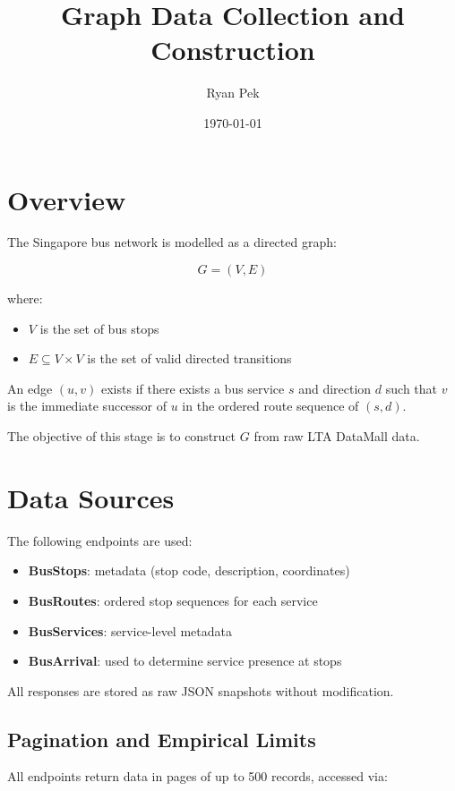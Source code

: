 \documentclass[11pt,a4paper]{article}
\title{Graph Data Collection and Construction}
\author{Ryan Pek}
\date{\today}
\begin{document}
\maketitle

\section{Overview}

The Singapore bus network is modelled as a directed graph:

\[
G = (V, E)
\]

where:

\begin{itemize}
    \item $V$ is the set of bus stops
    \item $E \subseteq V \times V$ is the set of valid directed transitions
\end{itemize}

An edge $(u,v)$ exists if there exists a bus service $s$ and direction $d$ such that $v$ is the immediate successor of $u$ in the ordered route sequence of $(s,d)$.

The objective of this stage is to construct $G$ from raw LTA DataMall data.

\section{Data Sources}

The following endpoints are used:

\begin{itemize}
    \item \textbf{BusStops}: metadata (stop code, description, coordinates)
    \item \textbf{BusRoutes}: ordered stop sequences for each service
    \item \textbf{BusServices}: service-level metadata
    \item \textbf{BusArrival}: used to determine service presence at stops
\end{itemize}

All responses are stored as raw JSON snapshots without modification.

\subsection{Pagination and Empirical Limits}

All endpoints return data in pages of up to 500 records, accessed via:
\end{document}
